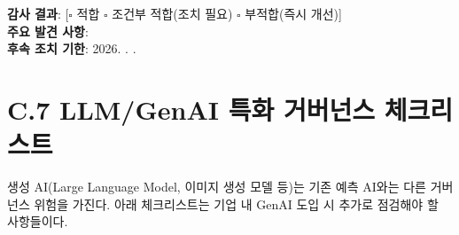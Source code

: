 \begin{tcolorbox}[colback=white, colframe=black!70, title={[Template C.6] 알고리즘 감사 체크리스트 (연간)}]
\textbf{감사 결과}: [$\square$ 적합 $\square$ 조건부 적합(조치 필요) $\square$ 부적합(즉시 개선)] \\
\textbf{주요 발견 사항}: \underline{\hspace{8cm}} \\
\textbf{후속 조치 기한}: 2026. \hspace{0.5cm} . \hspace{0.5cm} .
\end{tcolorbox}

\section*{C.7 LLM/GenAI 특화 거버넌스 체크리스트}

생성 AI(Large Language Model, 이미지 생성 모델 등)는 기존 예측 AI와는 다른 거버넌스 위험을 가진다. 아래 체크리스트는 기업 내 GenAI 도입 시 추가로 점검해야 할 사항들이다.

